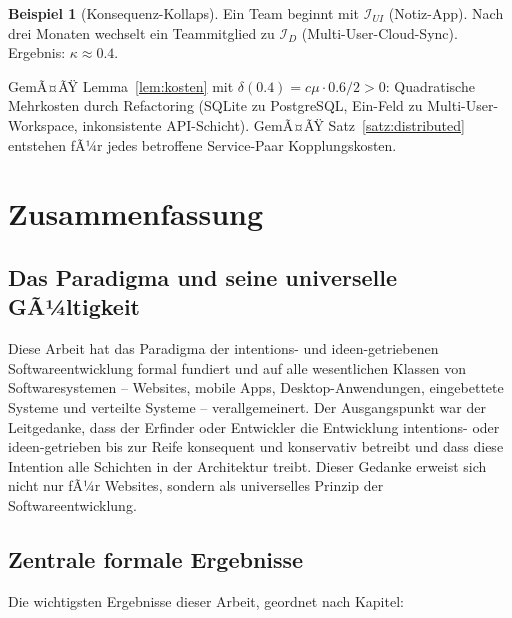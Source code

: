 ﻿\documentclass[a4paper,12pt]{article}
\theoremstyle{definition}
\newtheorem{beispiel}{Beispiel}
\begin{document}
\begin{beispiel}[Konsequenz-Kollaps]\label{bsp:inkonsistenz}
Ein Team beginnt mit $\mathcal{I}_{UI}$ (Notiz-App). Nach drei Monaten
wechselt ein Teammitglied zu $\mathcal{I}_D$ (Multi-User-Cloud-Sync).
Ergebnis: $\kappa \approx 0.4$.

GemÃ¤ÃŸ Lemma~\ref{lem:kosten} mit $\delta(0.4) = c\mu \cdot 0.6/2 > 0$:
Quadratische Mehrkosten durch Refactoring (SQLite zu PostgreSQL,
Ein-Feld zu Multi-User-Workspace, inkonsistente API-Schicht).
GemÃ¤ÃŸ Satz~\ref{satz:distributed} entstehen fÃ¼r jedes betroffene
Service-Paar Kopplungskosten.
\end{beispiel}

\section{Zusammenfassung}

\subsection{Das Paradigma und seine universelle GÃ¼ltigkeit}

Diese Arbeit hat das Paradigma der intentions- und ideen-getriebenen
Softwareentwicklung formal fundiert und auf alle wesentlichen Klassen
von Softwaresystemen -- Websites, mobile Apps, Desktop-Anwendungen,
eingebettete Systeme und verteilte Systeme -- verallgemeinert. Der
Ausgangspunkt war der Leitgedanke, dass der Erfinder oder Entwickler
die Entwicklung intentions- oder ideen-getrieben bis zur Reife konsequent
und konservativ betreibt und dass diese Intention alle Schichten in der
Architektur treibt. Dieser Gedanke erweist sich nicht nur fÃ¼r Websites,
sondern als universelles Prinzip der Softwareentwicklung.

\subsection{Zentrale formale Ergebnisse}

Die wichtigsten Ergebnisse dieser Arbeit, geordnet nach Kapitel:
\end{document}
